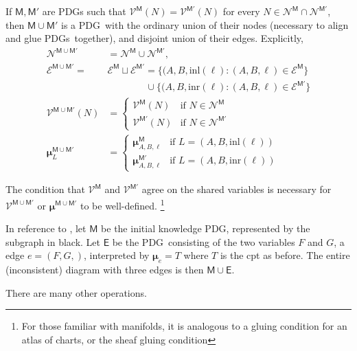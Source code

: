 \documentclass{article}
\newcommand{\notation}[2][]{#1}
\renewcommand{\notation}[2][]{{\color{notationcolor} #2}}
\newcommand{\vfullfootnote}[1]{}
\renewcommand{\vfullfootnote}[1]{\footnote{#1}}
\newcommand{\bmu}{\boldsymbol{\mu}}
\newcommand{\V}{\mathcal V}
\newcommand{\N}{\mathcal N}
\newcommand{\Ed}{\mathcal E}
\newcommand{\sfM}{\mathsf M}
\newcommand{\MN}{PDG}
\newcommand{\MNs}{\MN s}
\numberwithin{equation}{section}
\begin{document}
{	\begin{defn}[union] \label{def:model-union}
		If $\sfM, \sfM'$ are \MN s such that $\V^\sfM(N) = \V^{\sfM'}(N)$ for every $N \in  \N^{\sfM} \cap \N^{\sfM'}$, then $\sfM \cup \sfM'$ is a \MN\ with the ordinary union of their nodes (necessary to align and glue \MNs\ together), and disjoint union of their edges. \notation{Explicitly,
		\begin{align*}
			\N^{\sfM \cup \sfM'} &= \N^\sfM \cup \N^{\sfM'},  \\
			\Ed^{\sfM \cup \sfM'} \!=& \Ed^\sfM \sqcup \Ed^{\sfM'}\!
				=  \{ (A, B, \text{inl}(\ell) : (A,B,\ell)\in \Ed^\sfM \}  \\
					&\qquad\qquad \cup \{ (A, B, \text{inr}(\ell) : (A,B,\ell)\in \Ed^{\sfM'} \} \\ 
			\V^{\sfM \cup \sfM'} (N) &= \begin{cases}
					\V^{\sfM}(N) & \text{if }N \in \N^\sfM \\
					\V^{\sfM'}(N) &\text{if }N \in \N^{\sfM'} 
				\end{cases}\\
			\bmu^{\sfM \cup \sfM'}_L &= \begin{cases}
				\bmu^{\sfM}_{A, B, \ell} &\text{if } L = (A, B, \text{inl} (\ell)) \\
				\bmu^{\sfM'}_{A, B, \ell} &\text{if } L = (A, B, \text{inr} (\ell)) 
			\end{cases}
		\end{align*}}
	\end{defn}
	The condition that $\V^\sfM$ and $\V^{\sfM'}$ agree on the shared variables is necessary for $\V^{\sfM\cup \sfM'}$ or $\bmu^{\sfM \cup \sfM'}$ to be well-defined.%
		\vfullfootnote{For those familiar with manifolds, it is analogous to a gluing condition for an atlas of charts, or the sheaf gluing condition}
	
	\begin{example}[continues=ex:guns-and-floomps]
		In reference to , let $\sfM$ be the initial knowledge \MN, represented by the subgraph 
		in black. Let $\mathsf E$ be the \MN\ consisting of the two variables $F$ and $G$, a edge $e = (F, G,)$, interpreted by $\bmu_{e} = T$ where $T$ is the cpt as before. The entire (inconsistent) diagram with three edges is then
		$ \sfM \cup \mathsf E$.
	\end{example}

	There are many other operations. 
}
			
\end{document}
